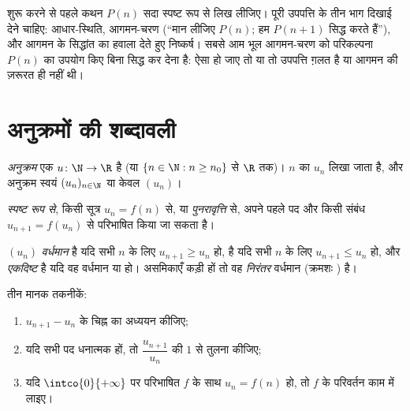 \begin{method}\label{met:g12:seq:induction}
शुरू करने से पहले कथन $P(n)$ सदा स्पष्ट रूप से लिख लीजिए। पूरी उपपत्ति के तीन
भाग दिखाई देने चाहिए: आधार-स्थिति, आगमन-चरण (``मान लीजिए $P(n)$; हम $P(n+1)$ सिद्ध
करते हैं''), और आगमन के सिद्धांत का हवाला देते हुए निष्कर्ष। सबसे आम भूल
आगमन-चरण को परिकल्पना $P(n)$ का उपयोग किए बिना सिद्ध कर देना है: ऐसा हो जाए तो
या तो उपपत्ति ग़लत है या आगमन की ज़रूरत ही नहीं थी।
\end{method}

\section{अनुक्रमों की शब्दावली}

\begin{definition}[अनुक्रम]\label{def:g12:seq:sequence}
\emph{अनुक्रम} एक  $u \colon \N \to \R$ है (या $\{n \in \N : n \geq n_0\}$ से $\R$ तक)। $n$ का
 $u_n$ लिखा जाता है, और अनुक्रम स्वयं $(u_n)_{n\in\N}$ या केवल $(u_n)$।
\end{definition}

 \emph{स्पष्ट रूप से}, किसी सूत्र $u_n = f(n)$ से, या \emph{पुनरावृत्ति} से,
अपने पहले पद और किसी संबंध $u_{n+1} = f(u_n)$ से परिभाषित किया जा सकता है।

\begin{definition}[एकदिष्टता]\label{def:g12:seq:monotonic}
 $(u_n)$ \emph{वर्धमान} है यदि सभी $n$ के लिए
$u_{n+1} \geq u_n$ हो, \emph{} है यदि सभी $n$ के लिए $u_{n+1} \leq u_n$ हो, और
\emph{एकदिष्ट} है यदि वह वर्धमान या  हो। असमिकाएँ कड़ी हों तो वह
\emph{निरंतर} वर्धमान (क्रमशः ) है।
\end{definition}

\begin{method}\label{met:g12:seq:monotonicity}
तीन मानक तकनीकें:
\begin{enumerate}
  \item $u_{n+1} - u_n$ के चिह्न का अध्ययन कीजिए;
  \item यदि सभी पद धनात्मक हों, तो $\dfrac{u_{n+1}}{u_n}$ की $1$ से तुलना कीजिए;
  \item यदि $\intco{0}{+\infty}$ पर परिभाषित $f$ के साथ $u_n = f(n)$ हो, तो $f$ के परिवर्तन काम
        में लाइए।
\end{enumerate}
\end{method}

